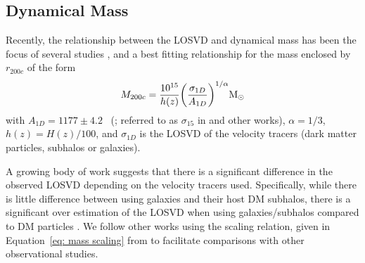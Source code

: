 \documentclass[apj, revtex4]{emulateapj}
\newcommand{\editorial}[1]{\textcolor{red}{#1}}
\begin{document}
\subsection{Dynamical Mass}\label{sec: mass}
Recently, the relationship between the LOSVD and dynamical mass has been the focus of several studies , and a best fitting relationship for the mass enclosed by $r_{200c}$ of the form
\begin{equation}\label{eq: mass scaling}
	M_{200c} = \frac{10^{15}}{h(z)} \bigg{(}\frac{\sigma_{1D}}{A_{1D}} \bigg{)}^{1/\alpha} \hbox{$\mathrm{M}_\odot$}
\end{equation}
with $A_{1D} = 1177 \pm 4.2$ \kms\ (\citealt{Munari2013}; referred to as $\sigma_{15}$ in \citealt{Evrard2008} and other works), $\alpha = 1/3$, $h(z) = H(z)/100$, and $\sigma_{1D}$ is the LOSVD of the velocity tracers (dark matter particles, subhalos or galaxies). 

A growing body of work suggests that there is a significant difference in the observed LOSVD depending on the velocity tracers used. Specifically, while there is little difference between using galaxies and their host DM subhalos, there is a significant over estimation of the LOSVD when using galaxies/subhalos compared to DM particles \citep{Munari2013}. We follow other works  using the scaling relation, given in Equation~\ref{eq: mass scaling} from \cite{Munari2013} to facilitate comparisons with other observational studies. 
\end{document}
